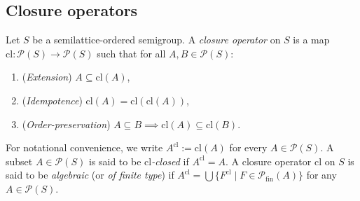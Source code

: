 \documentclass[10pt, reqno]{amsart}
\theoremstyle{plain}
\theoremstyle{definition}
\begin{document}
\subsection{Closure operators}
Let $S$ be a semilattice-ordered semigroup. A \emph{closure operator} on $S$ is a map $\mathrm{cl} : \mathcal{P}(S) \rightarrow \mathcal{P}(S)$ such that for all $A, B \in\mathcal{P}(S)$: 
\begin{enumerate}[label=(\arabic*)]
    \item (\emph{Extension}) $A \subseteq\mathrm{cl}(A)$, 
    \item (\emph{Idempotence}) $\mathrm{cl}(A) = \mathrm{cl}(\mathrm{cl}(A))$, 
    \item (\emph{Order-preservation}) $A \subseteq B \implies \mathrm{cl}(A) \subseteq \mathrm{cl}(B)$. 
\end{enumerate}
For notational convenience, we write $A^{\mathrm{cl}} := \mathrm{cl}(A)$ for every $A \in \mathcal{P}(S)$. A subset $A \in \mathcal{P}(S)$ is said to be \emph{$\mathrm{cl}$-closed} if $A^\mathrm{cl} = A$. A closure operator $\mathrm{cl}$ on $S$ is said to be \emph{algebraic} (or \emph{of finite type}) if $A^{\mathrm{cl}} = \bigcup\{F^{\mathrm{cl}} \mid F\in\mathcal{P}_{\mathrm{fin}}(A)\}$ for any $A \in \mathcal{P}(S)$. 
\end{document}
